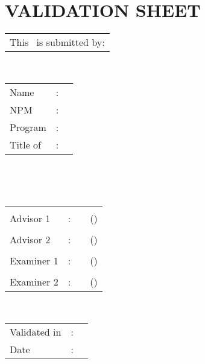 %
%
%

\chapter*{VALIDATION SHEET}

\vspace*{0.4cm}
\noindent

\noindent
\begin{tabular}{@{}l}
	This \type\ is submitted by:\\
\end{tabular} \\
\begin{tabular}{@{}ll l}
	Name&: & \penulis \\
	NPM&: & \npm \\
	Program&: & \program \\
	Title of \type&: & \judulInggris \\
\end{tabular} \\

\vspace*{1.0cm}

\noindent {}\\[0.2cm]

\begin{center}
\end{center}

\vspace*{0.3cm}

\begin{tabular}{l l l l }
	& & & \\
	Advisor 1&: & \pembimbingSatu & (\hspace*{3.0cm}) \\
	& & & \\
	Advisor 2&: & \pembimbingDua & (\hspace*{3.0cm}) \\
	& & & \\
	Examiner 1&: & \pengujiSatu & (\hspace*{3.0cm}) \\
	& & & \\
	Examiner 2&: & \pengujiDua & (\hspace*{3.0cm}) \\
\end{tabular}\\

\vspace*{2.0cm}

\begin{tabular}{ll l}
	Validated in&: & \kota \\
	Date&: & \tanggalLulus \\
\end{tabular}


\newpage
